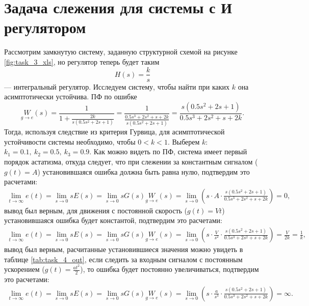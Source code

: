 \section{Задача слежения для системы с И регулятором}

Рассмотрим замкнутую систему, заданную структурной схемой на рисунке \ref{fig:task_3_xls},
но регулятор теперь будет таким
\begin{equation*}
    H(s)=\frac{k}{s}
\end{equation*}
--- интегральный регулятор. Исследуем систему, чтобы найти при каких $k$ она асимптотически
устойчива. ПФ по ошибке
\begin{equation*}
    \underset{g\rightarrow e}{W}(s)=\frac{1}{1+\frac{2k}{s(0.5s^2+2s+1)}}=\frac{1}{\frac{0.5s^3+2s^2+s+2k}{s(0.5s^2+2s+1)}}=\frac{s(0.5s^2+2s+1)}{0.5s^3+2s^2+s+2k}.
\end{equation*}
Тогда, используя следствие из критерия Гурвица, для асимптотической устойчивости системы
необходимо, чтобы $0<k<1$. Выберем $k$: $k_1=0.1,\ k_2=0.5,\ k_3=0.9$.
Как можно видеть по ПФ, система имеет первый порядок астатизма, откуда следует, что при слежении за
константным сигналом ($g(t)=A$) установившаяся ошибка должна быть равна нулю, подтвердим это расчетами:
\begin{multline*}
    \lim_{t\rightarrow\infty}e(t)
    =\lim_{s\rightarrow0}sE(s)
    =\lim_{s\rightarrow0}sG(s)\underset{g\rightarrow e}{W}(s)
    =\lim_{s\rightarrow0}\left(s\cdot A\cdot\frac{s(0.5s^2+2s+1)}{0.5s^3+2s^2+s+2k}\right)
    =0,
\end{multline*}
вывод был верным, для движения с постоянной 
скорость ($g(t)=Vt$) установившаяся ошибка будет константой, подтвердим это расчетами:
\begin{multline*}
    \lim_{t\rightarrow\infty}e(t)
    =\lim_{s\rightarrow0}sE(s)
    =\lim_{s\rightarrow0}sG(s)\underset{g\rightarrow e}{W}(s)
    =\lim_{s\rightarrow0}\left(s\cdot\frac{V}{s^2}\cdot\frac{s(0.5s^2+2s+1)}{0.5s^3+2s^2+s+2k}\right)
    =\frac{V}{2k}=\frac{1}{k},
\end{multline*}
вывод был верным, расчитанные установившиеся значения можно увидеть в таблице \ref{tab:task_4_out},
если следить за входным сигналом с 
постоянным ускорением ($g(t)=\frac{at^2}{2}$), то ошибка будет постоянно увеличиваться, подтвердим это расчетами:
\begin{multline*}
    \lim_{t\rightarrow\infty}e(t)
    =\lim_{s\rightarrow0}sE(s)
    =\lim_{s\rightarrow0}sG(s)\underset{g\rightarrow e}{W}(s)
    =\lim_{s\rightarrow0}\left(s\cdot\frac{a}{s^3}\cdot\frac{s(0.5s^2+2s+1)}{0.5s^3+2s^2+s+2k}\right)
    =\infty.
\end{multline*}

